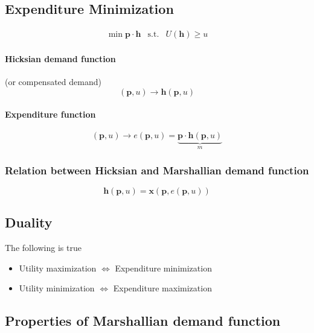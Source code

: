 \documentclass[a4paper] {scrartcl}
\begin{document}
\subsection{Expenditure Minimization}
\begin{eqnarray}
	\min \mathbf{p}\cdot \mathbf{h} &\text{s.t.}&
	U(\mathbf{h})\geq u
\end{eqnarray}

\paragraph{Hicksian demand function} %
\label{par:hicksian}
(or compensated demand)
\begin{equation}
	(\mathbf{p}, u)\rightarrow \mathbf{h}(\mathbf{p}, u)
\end{equation}

\paragraph{Expenditure function} %
\label{par:expenditure_function}
\begin{equation}
	(\mathbf{p},u)\rightarrow e(\mathbf{p}, u) = \underbrace{\mathbf{p}\cdot \mathbf{h}(\mathbf{p},u)}_{m}
\end{equation}

\subsubsection{Relation between Hicksian and Marshallian demand function}
\begin{equation}
	\mathbf{h}(\mathbf{p}, u)=\mathbf{x}(\mathbf{p}, e(\mathbf{p}, u))
\end{equation}


\subsection{Duality}
The following is true
\begin{itemize}
	\item Utility maximization $\Leftrightarrow$ Expenditure minimization
	\item Utility minimization $\Leftrightarrow$ Expenditure maximization
\end{itemize}

\subsection{Properties of Marshallian demand function}
\end{document}
